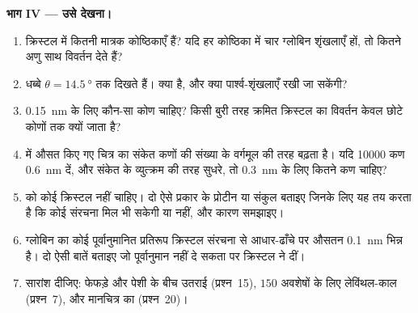 \begin{problem}
\medskip
\noindent\textbf{भाग IV --- उसे देखना।}
\begin{enumerate}[resume]
  \item क्रिस्टल में कितनी मात्रक कोष्ठिकाएँ हैं? यदि हर कोष्ठिका में
        चार ग्लोबिन शृंखलाएँ हों, तो कितने अणु साथ विवर्तन देते हैं?
  \item धब्बे $\theta = \qty{14.5}{\degree}$ तक दिखते हैं।  क्या
        है, और क्या पार्श्व-शृंखलाएँ रखी जा सकेंगी?
  \item \qty{0.15}{nm} के लिए कौन-सा कोण चाहिए? किसी बुरी तरह क्रमित
        क्रिस्टल का विवर्तन केवल छोटे कोणों तक क्यों जाता है?
  \item {} में औसत किए गए चित्र का संकेत
        कणों की संख्या के वर्गमूल की तरह बढ़ता है। यदि
        \num{10000} कण \qty{0.6}{nm} दें, और  संकेत के व्युत्क्रम
        की तरह सुधरे, तो \qty{0.3}{nm} के लिए कितने कण चाहिए?
  \item {} को कोई क्रिस्टल नहीं चाहिए।
        दो ऐसे प्रकार के प्रोटीन या संकुल बताइए जिनके लिए यह तय करता
        है कि कोई संरचना मिल भी सकेगी या नहीं, और कारण समझाइए।
  \item ग्लोबिन का कोई पूर्वानुमानित प्रतिरूप क्रिस्टल संरचना से
        आधार-ढाँचे पर औसतन \qty{0.1}{nm} भिन्न है। दो ऐसी बातें
        बताइए जो पूर्वानुमान नहीं दे सकता पर क्रिस्टल ने दीं।
  \item सारांश दीजिए: फेफड़े और पेशी के बीच उतराई (प्रश्न~15),
        $150$ अवशेषों के लिए लेविंथल-काल (प्रश्न~7), और मानचित्र का
         (प्रश्न~20)।
\end{enumerate}
\end{problem}

